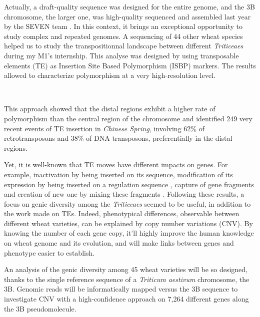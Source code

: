 \documentclass[a4paper, 12pt]{article}
\begin{document}
\begin{onehalfspace}
Actually, a draft-quality sequence was designed for the entire genome, and the 3B chromosome, the larger one, was high-quality sequenced and assembled last year by the SEVEN team \citep{Choulet2k14}. In this context, it brings an exceptional opportunity to study complex and repeated genomes. A sequencing of 44 other wheat species helped us to study the transpositionnal landscape between different \textit{Triticeaes} during my M1's internship. This analyse was designed by using transposable elements (TE) as Insertion Site Based Polymorphism (ISBP) markers. The results allowed to characterize polymorphism at a very high-resolution level. 

\newpage %
\thispagestyle{empty}
~
\addtocounter{page}{-1}
\newpage
\clearpage %

This approach showed that the distal regions exhibit a higher rate of polymorphism than the central region of the chromosome and identified 249 very recent events of TE insertion in \textit{Chinese Spring}, involving 62\% of retrotransposons and 38\% of DNA transposons, preferentially in the distal regions.

Yet, it is well-known that TE moves have different impacts on genes. For example, inactivation by being inserted on its sequence, modification of its expression by being inserted on a regulation sequence \citep{Goettel2010}, capture of gene fragments \citep{Jameson2008} and creation of new one by mixing these fragments \citep{Jiang2004}. Following these results, a focus on genic diversity among the \textit{Triticeaes} seemed to be useful, in addition to the work made on TEs. Indeed, phenotypical differences, observable between different wheat varieties, can be explained by copy number variations (CNV). By knowing the number of each gene copy, it'll highly improve the human knowledge on wheat genome and its evolution, and will make links between genes and phenotype easier to establish.

An analysis of the genic diversity among 45 wheat varieties will be so designed, thanks to the single reference sequence of a \textit{Triticum aestivum} chromosome, the 3B. Genomic reads will be informatically mapped versus the 3B sequence to investigate CNV with a high-confidence approach on 7,264 different genes along the 3B pseudomolecule.



\end{onehalfspace}
\end{document}
